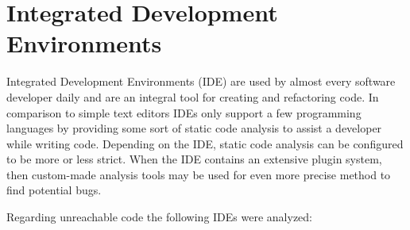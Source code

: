 \clearpage
\pagebreak
\section{Integrated Development Environments}
\label{sec:intelliJ}
Integrated Development Environments (IDE) are used by almost every software developer daily and are an integral tool for creating and refactoring code.
In comparison to simple text editors IDEs only support a few programming languages by providing some sort of static code analysis to assist a developer while writing code. 
Depending on the IDE, static code analysis can be configured to be more or less strict. 
When the IDE contains an extensive plugin system, then custom-made analysis tools may be used for even more precise method to find potential bugs.


Regarding unreachable code the following IDEs were analyzed:
